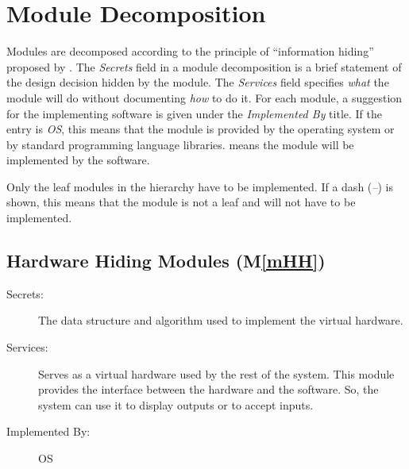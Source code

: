 \documentclass[12pt, titlepage]{article}
\newcommand{\mref}[1]{M\ref{#1}}
\begin{document}

\section{Module Decomposition} \label{SecMD}

Modules are decomposed according to the principle of ``information hiding'' proposed by
\citet{ParnasEtAl1984}. The \emph{Secrets} field in a module decomposition is a brief statement of
the design decision hidden by the module. The \emph{Services} field specifies \emph{what} the
module will do without documenting \emph{how} to do it. For each module, a suggestion for the
implementing software is given under the \emph{Implemented By} title. If the entry is \emph{OS},
this means that the module is provided by the operating system or by standard programming language
libraries. \emph{\progname{}} means the module will be implemented by the \progname{} software.

Only the leaf modules in the hierarchy have to be implemented. If a dash (\emph{--}) is shown, this
means that the module is not a leaf and will not have to be implemented.

\subsection{Hardware Hiding Modules (\mref{mHH})}

\begin{description}
  \item[Secrets:]The data structure and algorithm used to implement the virtual hardware.
  \item[Services:]Serves as a virtual hardware used by the rest of the system. This module provides the
  interface between the hardware and the software. So, the system can use it to display outputs or to
  accept inputs.
  \item[Implemented By:] OS
\end{description}
\end{document}
